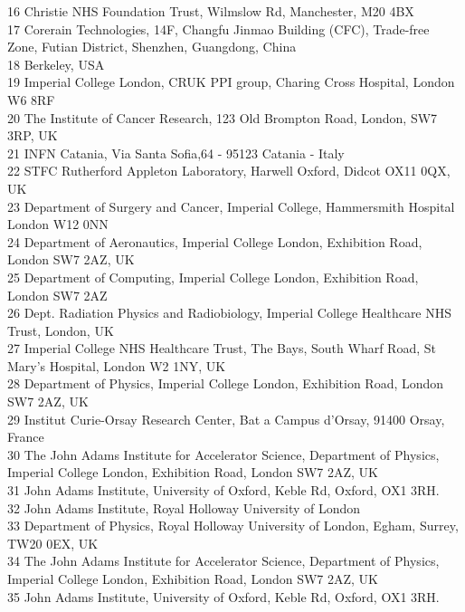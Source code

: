 {\begin{tabbing}
     16 \> Christie NHS Foundation Trust, Wilmslow Rd, Manchester, M20 4BX\\
     17 \> Corerain Technologies, 14F, Changfu Jinmao Building (CFC), Trade-free Zone, Futian District, Shenzhen, Guangdong, China\\
     18 \> Berkeley, USA\\
     19 \> Imperial College London, CRUK PPI group, Charing Cross Hospital, London W6 8RF\\
     20 \> The Institute of Cancer Research, 123 Old Brompton Road, London, SW7 3RP, UK\\
     21 \> INFN Catania, Via Santa Sofia,64 - 95123 Catania - Italy\\
     22 \> STFC Rutherford Appleton Laboratory, Harwell Oxford, Didcot OX11 0QX, UK\\
     23 \> Department of Surgery and Cancer, Imperial College, Hammersmith Hospital London W12 0NN\\
     24 \> Department of Aeronautics, Imperial College London, Exhibition Road, London SW7 2AZ, UK\\
     25 \> Department of Computing, Imperial College London, Exhibition Road, London SW7 2AZ\\
     26 \> Dept. Radiation Physics and Radiobiology, Imperial College Healthcare NHS Trust, London, UK\\
     27 \> Imperial College NHS Healthcare Trust, The Bays, South Wharf Road, St Mary's Hospital, London W2 1NY, UK\\
     28 \> Department of Physics, Imperial College London, Exhibition Road, London SW7 2AZ, UK\\
     29 \> Institut Curie-Orsay Research Center, Bat a Campus d'Orsay, 91400 Orsay, France\\
     30 \> The John Adams Institute for Accelerator Science, Department of Physics, Imperial College London, Exhibition Road, London SW7 2AZ, UK\\
     31 \> John Adams Institute, University of Oxford, Keble Rd, Oxford, OX1 3RH.\\
     32 \> John Adams Institute, Royal Holloway University of London\\
     33 \> Department of Physics, Royal Holloway University of London, Egham, Surrey, TW20 0EX, UK\\
     34 \> The John Adams Institute for Accelerator Science, Department of Physics, Imperial College London, Exhibition Road, London SW7 2AZ, UK\\
     35 \> John Adams Institute, University of Oxford, Keble Rd, Oxford, OX1 3RH.\\

\end{tabbing}}
